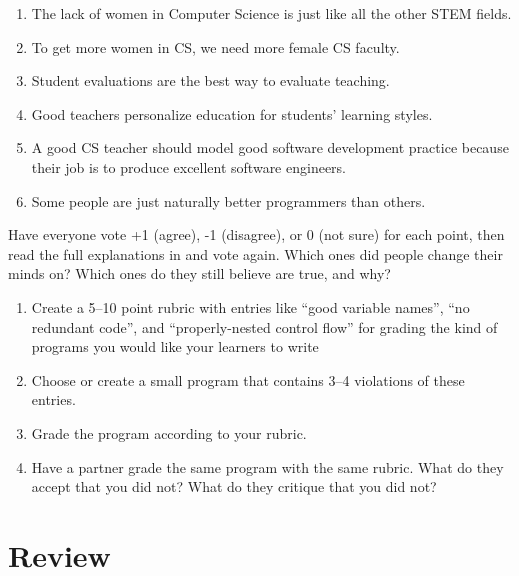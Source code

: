 \begin{enumerate}
\item
  The lack of women in Computer Science is just like all the other STEM fields.
\item
  To get more women in CS, we need more female CS faculty.
\item
  Student evaluations are the best way to evaluate teaching.
\item
  Good teachers personalize education for students' learning styles.
\item
  A good CS teacher should model good software development practice
  because their job is to produce excellent software engineers.
\item
  Some people are just naturally better programmers than others.
\end{enumerate}

Have everyone vote +1 (agree), -1 (disagree), or 0 (not sure) for each point,
then read the full explanations in
and vote again.
Which ones did people change their minds on?
Which ones do they still believe are true, and why?


\begin{enumerate}

\item
  Create a 5--10 point rubric
  with entries like ``good variable names'', ``no redundant code'', and ``properly-nested control flow''
  for grading the kind of programs you would like your learners to write

\item
  Choose or create a small program that contains 3--4 violations of these entries.

\item
  Grade the program according to your rubric.

\item
  Have a partner grade the same program with the same rubric.
  What do they accept that you did not?
  What do they critique that you did not?

\end{enumerate}

\section*{Review}

